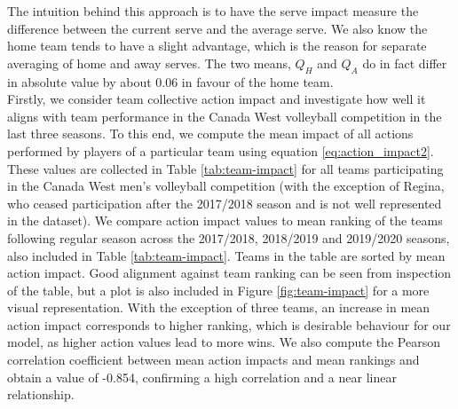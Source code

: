\documentclass{sfuthesis}
\begin{document}
	The intuition behind this approach is to have the serve impact measure the difference between the current serve and the average serve. We also know the home team tends to have a slight advantage, which is the reason for separate averaging of home and away serves. The two means, $Q_H$ and $Q_A$ do in fact differ in absolute value by about 0.06 in favour of the home team.\\
	Firstly, we consider team collective action impact and investigate how well it aligns with team performance in the Canada West volleyball competition in the last three seasons. To this end, we compute the mean impact of all actions performed by players of a particular team using equation \eqref{eq:action_impact2}. These values are collected in Table \ref{tab:team-impact} for all teams participating in the Canada West men's volleyball competition (with the exception of Regina, who ceased participation after the 2017/2018 season and is not well represented in the dataset). We compare action impact values to mean ranking of the teams following regular season across the 2017/2018, 2018/2019 and 2019/2020 seasons, also included in Table \ref{tab:team-impact}. Teams in the table are sorted by mean action impact. Good alignment against team ranking can be seen from inspection of the table, but a plot is also included in Figure \ref{fig:team-impact} for a more visual representation. With the exception of three teams, an increase in mean action impact corresponds to higher ranking, which is desirable behaviour for our model, as higher action values lead to more wins. We also compute the Pearson correlation coefficient between mean action impacts and mean rankings and obtain a value of -0.854, confirming a high correlation and a near linear relationship.\\
\end{document}
